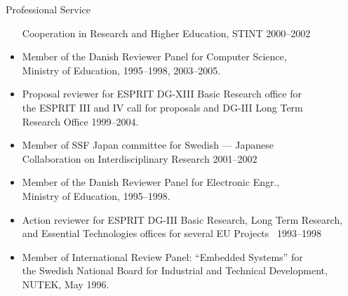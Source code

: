 \documentclass{article}
\begin{document}
\begin{cv}
\begin{cvlist}{Professional Service}
\begin{itemize}
			      Cooperation in Research and Higher Education,  STINT
			      \cftdotfill{\cftdotsep}  2000--2002
			\item Member of the Danish Reviewer Panel for Computer Science,\\
			      Ministry of Education, \cftdotfill{\cftdotsep}  1995--1998, 2003--2005.
			\item Proposal reviewer for ESPRIT DG-XIII Basic Research office for\\
			      the ESPRIT III and IV call for proposals and DG-III Long Term\\
			      Research Office \cftdotfill{\cftdotsep}  1999--2004.
			\item Member of SSF Japan committee for Swedish --- Japanese\\
			      Collaboration on Interdisciplinary Research \cftdotfill{\cftdotsep}
			      2001--2002
			\item Member of the Danish Reviewer Panel for Electronic Engr.,\\
			      Ministry of Education, \cftdotfill{\cftdotsep}  1995--1998.
			\item Action reviewer for ESPRIT DG-III Basic Research, Long Term
			      Research,\\ and Essential Technologies offices for several EU
			      Projects\ \cftdotfill{\cftdotsep} 1993--1998
			\item Member of International Review Panel: ``Embedded Systems'' for\\
			      the Swedish National Board for Industrial and Technical Development,\\
			      NUTEK, \cftdotfill{\cftdotsep} May 1996.
		\end{itemize}
	\end{cvlist}


\end{cv}
\end{document}
